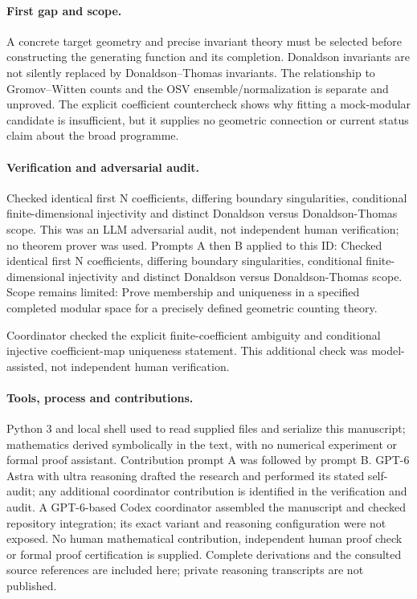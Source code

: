 \documentclass[11pt]{article}
\begin{document}
\paragraph{First gap and scope.}A concrete target geometry and precise invariant theory must be selected before constructing the generating function and its completion. Donaldson invariants are not silently replaced by Donaldson--Thomas invariants. The relationship to Gromov--Witten counts and the OSV ensemble/normalization is separate and unproved. The explicit coefficient countercheck shows why fitting a mock-modular candidate is insufficient, but it supplies no geometric connection or current status claim about the broad programme.

\paragraph{Verification and adversarial audit.}
Checked identical first N coefficients, differing boundary singularities, conditional finite-dimensional injectivity and distinct Donaldson versus Donaldson-Thomas scope. This was an LLM adversarial audit, not independent human verification; no theorem prover was used. Prompts A then B applied to this ID: Checked identical first N coefficients, differing boundary singularities, conditional finite-dimensional injectivity and distinct Donaldson versus Donaldson-Thomas scope. Scope remains limited: Prove membership and uniqueness in a specified completed modular space for a precisely defined geometric counting theory.

Coordinator checked the explicit finite-coefficient ambiguity and conditional injective coefficient-map uniqueness statement. This additional check was model-assisted, not independent human verification.

\paragraph{Tools, process and contributions.}
Python 3 and local shell used to read supplied files and serialize this manuscript; mathematics derived symbolically in the text, with no numerical experiment or formal proof assistant. Contribution prompt A was followed by prompt B. GPT-6 Astra with ultra reasoning drafted the research and performed its stated self-audit; any additional coordinator contribution is identified in the verification and audit. A GPT-6-based Codex coordinator assembled the manuscript and checked repository integration; its exact variant and reasoning configuration were not exposed. No human mathematical contribution, independent human proof check or formal proof certification is supplied. Complete derivations and the consulted source references are included here; private reasoning transcripts are not published.
\end{document}

